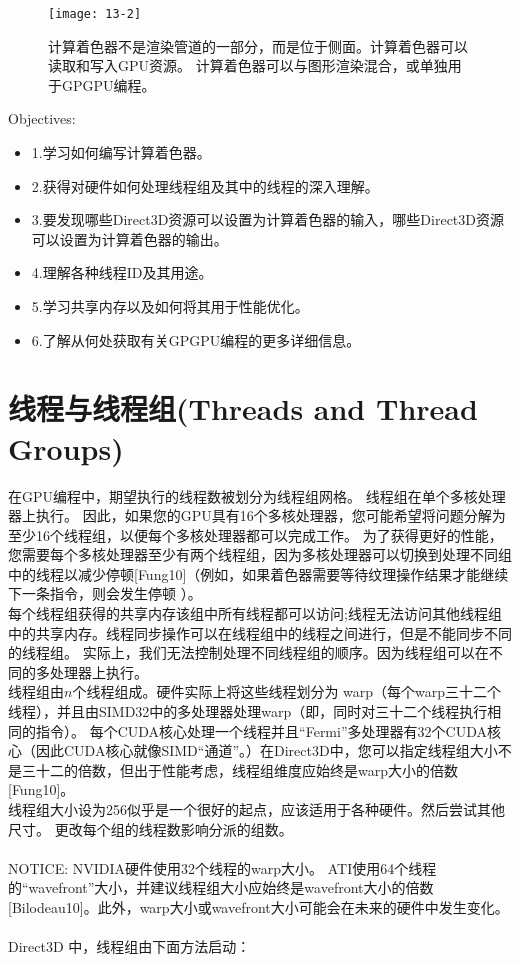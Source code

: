 \begin{figure}[h]
    \texttt{[image: 13-2]}
    \centering
    \caption{计算着色器不是渲染管道的一部分，而是位于侧面。计算着色器可以读取和写入GPU资源。 计算着色器可以与图形渲染混合，或单独用于GPGPU编程。}
    \label{fig:13-2}
\end{figure}

\clearpage

{\large Objectives:}
\begin{itemize}
    \item 1.学习如何编写计算着色器。
    \item 2.获得对硬件如何处理线程组及其中的线程的深入理解。
    \item 3.要发现哪些Direct3D资源可以设置为计算着色器的输入，哪些Direct3D资源可以设置为计算着色器的输出。
    \item 4.理解各种线程ID及其用途。
    \item 5.学习共享内存以及如何将其用于性能优化。
    \item 6.了解从何处获取有关GPGPU编程的更多详细信息。
\end{itemize}

\section{线程与线程组(Threads and Thread Groups)}
\begin{flushleft}
在GPU编程中，期望执行的线程数被划分为线程组网格。 线程组在单个多核处理器上执行。 因此，如果您的GPU具有16个多核处理器，您可能希望将问题分解为至少16个线程组，以便每个多核处理器都可以完成工作。 为了获得更好的性能，您需要每个多核处理器至少有两个线程组，因为多核处理器可以切换到处理不同组中的线程以减少停顿[Fung10]（例如，如果着色器需要等待纹理操作结果才能继续下一条指令，则会发生停顿 ）。\\

每个线程组获得的共享内存该组中所有线程都可以访问;线程无法访问其他线程组中的共享内存。线程同步操作可以在线程组中的线程之间进行，但是不能同步不同的线程组。 实际上，我们无法控制处理不同线程组的顺序。因为线程组可以在不同的多处理器上执行。\\

线程组由$n$个线程组成。硬件实际上将这些线程划分为 warp（每个warp三十二个线程），并且由SIMD32中的多处理器处理warp（即，同时对三十二个线程执行相同的指令）。 每个CUDA核心处理一个线程并且“Fermi”多处理器有32个CUDA核心（因此CUDA核心就像SIMD“通道”。）在Direct3D中，您可以指定线程组大小不是三十二的倍数，但出于性能考虑，线程组维度应始终是warp大小的倍数[Fung10]。\\

线程组大小设为256似乎是一个很好的起点，应该适用于各种硬件。然后尝试其他尺寸。 更改每个组的线程数影响分派的组数。\\

~\\
NOTICE: NVIDIA硬件使用32个线程的warp大小。 ATI使用64个线程的“wavefront”大小，并建议线程组大小应始终是wavefront大小的倍数[Bilodeau10]。此外，warp大小或wavefront大小可能会在未来的硬件中发生变化。
~\\

Direct3D 中，线程组由下面方法启动：\\
\end{flushleft}


